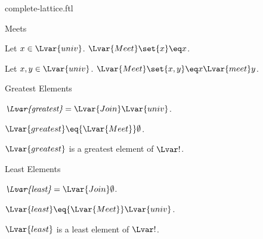 \documentclass{naproche-library}
\begin{document}
\begin{smodule}[title=Complete Lattices]{complete-lattice.ftl}
\begin{sfragment}{Meets}
  \begin{proposition*}[forthel,id=MeetOfSingletonThm]
    Let $x\in\Lvar{univ}$.
    ${\Lvar{Meet}}\set{x}\eq x$.
  \end{proposition*}

  \begin{proposition*}[forthel,id=MeetOfPairThm]
    Let $x,y\in\Lvar{univ}$.
    ${\Lvar{Meet}}\set{x,y}\eq x{\Lvar{meet}}y$.
  \end{proposition*}
\end{sfragment}

\begin{sfragment}{Greatest Elements}
  \begin{definition*}[forthel,id=CompleteLatticeGreatestDef]
    $\emph{{\Lvar{greatest}}}={\Lvar{Join}}\Lvar{univ}$.
  \end{definition*}

  \begin{proposition*}[forthel,id=GreatestIsMeetOfEmptystThm]
    ${\Lvar{greatest}}\eq{\Lvar{Meet}}\emptyset$.
  \end{proposition*}

  \begin{proposition*}[forthel,id=GreatestIsGreatestElement]
    ${\Lvar{greatest}}$ is a greatest element of $\Lvar!$.
  \end{proposition*}
\end{sfragment}

\begin{sfragment}{Least Elements}
  \begin{definition*}[forthel,id=CompleteLatticeLeastDef]
    $\emph{{\Lvar{least}}}={\Lvar{Join}}\emptyset$.
  \end{definition*}

  \begin{proposition*}[forthel,id=GreatestIsMeetOfUniverseThm]
    ${\Lvar{least}}\eq{\Lvar{Meet}}\Lvar{univ}$.
  \end{proposition*}

  \begin{proposition*}[forthel,id=LeastIsLeastElementThm]
    ${\Lvar{least}}$ is a least element of $\Lvar!$.
  \end{proposition*}
\end{sfragment}
\end{smodule}
\end{document}
